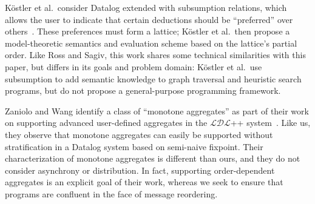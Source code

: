 K\"{o}stler et al.\ consider Datalog extended with subsumption relations, which
allows the user to indicate that certain deductions should be ``preferred'' over
others~\cite{Kostler1995}. These preferences must form a lattice; K\"{o}stler et
al.\ then propose a model-theoretic semantics and evaluation scheme based on the
lattice's partial order. Like Ross and Sagiv, this work shares some technical
similarities with this paper, but differs in its goals and problem domain:
K\"{o}stler et al.\ use subsumption to add semantic knowledge to graph traversal
and heuristic search programs, but do not propose a general-purpose programming
framework.

Zaniolo and Wang identify a class of ``monotone aggregates'' as part of their
work on supporting advanced user-defined aggregates in the $\mathcal{LDL}$++
system~\cite{Zaniolo1999}. Like us, they observe that monotone aggregates can
easily be supported without stratification in a Datalog system based on
semi-naive fixpoint. Their characterization of monotone aggregates is different
than ours, and they do not consider asynchrony or distribution.  In fact,
supporting order-dependent aggregates is an explicit goal of their work, whereas
we seek to ensure that programs are confluent in the face of message reordering.
